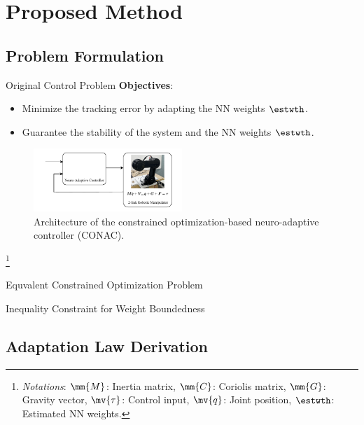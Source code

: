 \documentclass[8pt, aspectratio=169]{beamer}
\begin{document}
\section{Proposed Method}

\subsection{Problem Formulation}

\begin{frame}{\insertsubsectionhead}{Original Control Problem}
  \textbf{Objectives}:
  \begin{itemize}
    \item Minimize the tracking error by adapting the NN weights $\estwth$.
    \item Guarantee the stability of the system and the NN weights $\estwth$.
  \end{itemize}
  
  \begin{figure}
    \includegraphics[width=0.5\textwidth]{figures/problem.drawio.pdf}
    \caption{Architecture of the constrained optimization-based neuro-adaptive controller (CONAC).}
  \end{figure}

  \let\thefootnote\relax\footnote{
    \textit{Notations}: 
      $\mm{M}$: Inertia matrix, $\mm{C}$: Coriolis matrix, $\mm{G}$: Gravity vector, $\mv{\tau}$: Control input, $\mv{q}$: Joint position, $\estwth$: Estimated NN weights.
      }

\end{frame}

\begin{frame}{\insertsubsectionhead}{Equvalent Constrained Optimization Problem}

\end{frame}

\begin{frame}{\insertsubsectionhead}{Inequality Constraint for Weight Boundedness}

\end{frame}

\subsection{Adaptation Law Derivation}
\end{document}
